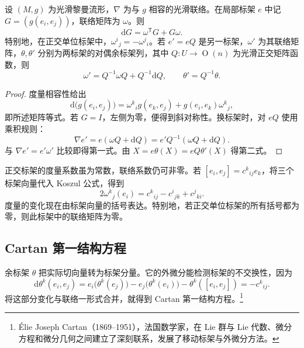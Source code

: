 \begin{proposition}\label{g3:prop:frame-metric-and-change}
	设 \((M,g)\) 为光滑黎曼流形，\(\nabla\) 为与 \(g\) 相容的光滑联络。在局部标架 \(e\) 中记 \(G=(g(e_i,e_j))\)，联络矩阵为 \(\omega\)。则
	\[
		\mathrm{d}G=\omega^{\mathsf T}G+G\omega.
	\]
	特别地，在正交单位标架中，\(\omega^i{}_j=-\omega^j{}_i\)。若 \(e'=eQ\) 是另一标架，\(\omega'\) 为其联络矩阵，\(\theta,\theta'\) 分别为两标架的对偶余标架列，其中 \(Q:U\to\operatorname{O}(n)\) 为光滑正交矩阵函数，则
	\begin{equation}\label{g3:eq:orthonormal-frame-change}
		\omega'=Q^{-1}\omega Q+Q^{-1}\mathrm{d}Q,\qquad
		\theta'=Q^{-1}\theta.
	\end{equation}
\end{proposition}
\begin{proof}
	度量相容性给出
	\[
		\mathrm{d}\bigl(g(e_i,e_j)\bigr)
		=\omega^k{}_i g(e_k,e_j)+g(e_i,e_k)\omega^k{}_j,
	\]
	即所述矩阵等式。若 \(G=I\)，左侧为零，便得到斜对称性。换标架时，对 \(eQ\) 使用乘积规则：
	\[
		\nabla e'=e(\omega Q+\mathrm{d}Q)
		=e'Q^{-1}(\omega Q+\mathrm{d}Q).
	\]
	与 \(\nabla e'=e'\omega'\) 比较即得第一式。由 \(X=e\theta(X)=eQ\theta'(X)\) 得第二式。
\end{proof}

正交标架的度量系数虽为常数，联络系数仍可非零。若 \([e_i,e_j]=c^k{}_{ij}e_k\)，将三个标架向量代入 Koszul 公式，得到
\begin{equation}\label{g3:eq:orthonormal-koszul}
	2\omega^k{}_j(e_i)=c^k{}_{ij}-c^i{}_{jk}+c^j{}_{ki}.
\end{equation}
度量的变化现在由标架向量的括号表达。特别地，若正交单位标架的所有括号都为零，则此标架中的联络矩阵为零。

\subsection{Cartan 第一结构方程}
\label{g3:subsec:0103:02}

余标架 \(\theta\) 把实际切向量转为标架分量。它的外微分能检测标架的不交换性，因为
\[
	\mathrm{d}\theta^k(e_i,e_j)
	=e_i\bigl(\theta^k(e_j)\bigr)-e_j\bigl(\theta^k(e_i)\bigr)
	-\theta^k([e_i,e_j])=-c^k{}_{ij}.
\]
将这部分变化与联络一形式合并，就得到 Cartan 第一结构方程。\footnote{Élie Joseph Cartan（1869--1951），法国数学家，在 Lie 群与 Lie 代数、微分方程和微分几何之间建立了深刻联系，发展了移动标架与外微分方法。}

